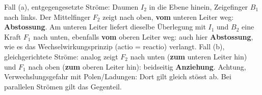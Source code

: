 \documentclass[addpoints,11pt,a4paper]{exam}
\begin{document}
\begin{questions}
\begin{taskbox}
\begin{parts}
\begin{solution}
\begin{center}
  \end{center}
  Fall (a), entgegengesetzte Ströme: Daumen $I_2$ in die Ebene hinein,
  Zeigefinger $B_1$ nach links. Der Mittelfinger $F_2$ zeigt nach oben,
  \textbf{vom} unteren Leiter weg: \textbf{Abstossung}. Am unteren Leiter
  liefert dieselbe Überlegung mit $I_1$ und $B_2$ eine Kraft $F_1$ nach
  unten, ebenfalls \textbf{vom} oberen Leiter weg: auch hier
  \textbf{Abstossung}, wie es das Wechselwirkungsprinzip (actio =
  reactio) verlangt. Fall (b), gleichgerichtete Ströme: analog zeigt
  $F_2$ nach unten (\textbf{zum} unteren Leiter hin) und $F_1$ nach oben
  (\textbf{zum} oberen Leiter hin): beidseitig \textbf{Anziehung}.
  Achtung, Verwechslungsgefahr mit Polen/Ladungen: Dort gilt \glqq gleich
  stösst ab\grqq{}. Bei parallelen Strömen gilt das Gegenteil.
  \end{solution}
\end{parts}
\end{taskbox}
\end{questions}
\end{document}
